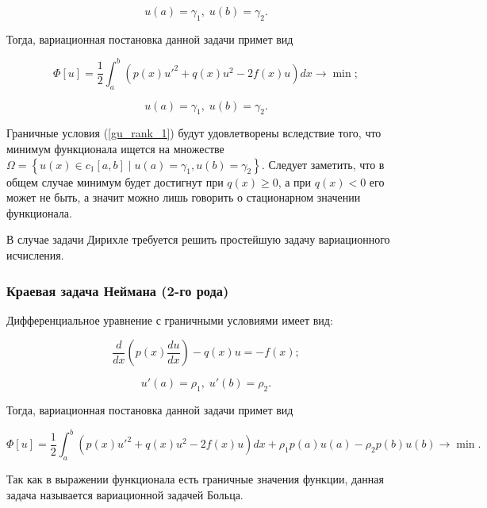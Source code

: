\documentclass{article}
\begin{document}
\begin{equation} \label{gu_rank_1}
	u(a) = \gamma_{1}, \; u(b) = \gamma_{2}.
\end{equation}

\noindent Тогда, вариационная постановка данной задачи примет вид

\begin{displaymath}
	\Phi[u] = \frac{1}{2} \int_{a}^{b} \left( p(x)u'^{2} + q(x)u^{2} - 2f(x)u \right)dx \to \min;
\end{displaymath}

\begin{displaymath}
	u(a) = \gamma_{1}, \; u(b) = \gamma_{2}.
\end{displaymath}

Граничные условия (\ref{gu_rank_1}) будут удовлетворены вследствие того, что минимум функционала ищется на множестве $\Omega = \left\{ u(x) \in c_{1}\left[ a, b \right] \; | \; u(a)=\gamma_{1}, u(b)=\gamma_{2} \right\}$. Следует заметить, что в общем случае минимум будет достигнут при $q(x) \geq 0$, а при $q(x) < 0$ его может не быть, а значит можно лишь говорить о стационарном значении функционала.

В случае задачи Дирихле требуется решить простейшую задачу вариационного исчисления.

\subsubsection{Краевая задача Неймана (2-го рода)}

Дифференциальное уравнение с граничными условиями имеет вид:

\begin{displaymath}
	\frac{d }{dx} \left( p(x) \frac{du}{dx} \right) - q(x)u = -f(x);
\end{displaymath}

\begin{equation} \label{gu_rank_2}
	u'(a) = \rho_{1}, \; u'(b) = \rho_{2}.
\end{equation}

\noindent Тогда, вариационная постановка данной задачи примет вид

\begin{displaymath}
	\Phi[u] = \frac{1}{2} \int_{a}^{b} \left( p(x)u'^{2} + q(x)u^{2} - 2f(x)u \right)dx + \rho_{1}p(a)u(a) - \rho_{2}p(b)u(b) \to \min.
\end{displaymath}

\begin{info} 
	Так как в выражении функционала есть граничные значения функции, данная задача называется вариационной задачей Больца.
\end{info}
\end{document}
